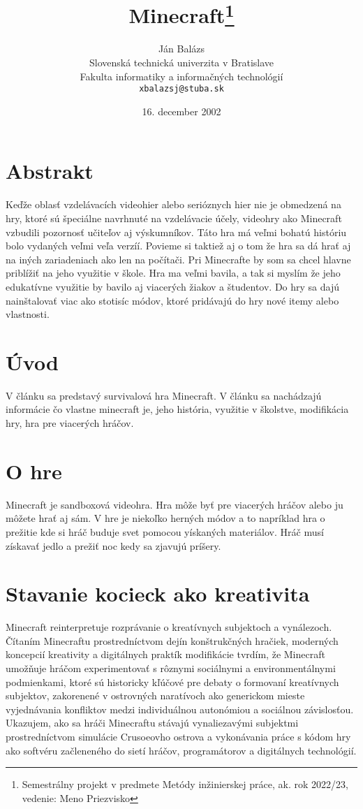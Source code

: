 \documentclass[10pt,twoside,slovak,a4paper]{article}
\title{Minecraft\thanks{Semestrálny projekt v predmete Metódy inžinierskej práce, ak. rok 2022/23, vedenie: Meno Priezvisko}} %
\author{Ján Balázs\\[2pt]
	{\small Slovenská technická univerzita v Bratislave}\\
	{\small Fakulta informatiky a informačných technológií}\\
	{\small \texttt{xbalazsj@stuba.sk}}
	}
\date{\small 16. december 2002} %
\begin{document}
\maketitle

\section{Abstrakt}

Keďže oblasť vzdelávacích videohier alebo serióznych hier nie je
obmedzená na hry, ktoré sú špeciálne navrhnuté na vzdelávacie účely,
videohry ako Minecraft vzbudili pozornosť učiteľov aj výskumníkov. Táto hra
má veľmi bohatú históriu bolo vydaných veľmi veľa verzíí. Povieme si taktiež
aj o tom že hra sa dá hrať aj na iných zariadeniach ako len na počítači.
Pri Minecrafte by som sa chcel hlavne priblížiť na jeho využitie v škole. Hra
ma veľmi bavila, a tak si myslím že jeho edukatívne využitie by bavilo aj
viacerých žiakov a študentov. Do hry sa dajú nainštalovať viac ako stotisíc
módov, ktoré pridávajú do hry nové itemy alebo vlastnosti.

\section{Úvod}

V článku sa predstavý survivalová hra Minecraft. V článku sa nachádzajú informácie čo vlastne minecraft je, jeho história, využitie v školstve, modifikácia hry, hra pre viacerých hráčov.



\section{O hre} 

Minecraft je sandboxová videohra. Hra môže byť pre viacerých hráčov alebo ju môžete hrať aj sám. V hre je niekoľko herných módov a to napríklad hra o prežitie kde si hráč buduje svet pomocou yískaných materiálov. Hráč musí získavať jedlo a prežiť noc kedy sa zjavujú príšery.

\section{Stavanie kocieck ako kreativita} 

Minecraft reinterpretuje rozprávanie o kreatívnych subjektoch a vynálezoch. Čítaním Minecraftu prostredníctvom dejín konštrukčných hračiek, moderných koncepcií kreativity a digitálnych praktík modifikácie tvrdím, že Minecraft umožňuje hráčom experimentovať s rôznymi sociálnymi a environmentálnymi podmienkami, ktoré sú historicky kľúčové pre debaty o formovaní kreatívnych subjektov, zakorenené v ostrovných naratívoch ako generickom mieste vyjednávania konfliktov medzi individuálnou autonómiou a sociálnou závislosťou. Ukazujem, ako sa hráči Minecraftu stávajú vynaliezavými subjektmi prostredníctvom simulácie Crusoeovho ostrova a vykonávania práce s kódom hry ako softvéru začleneného do sietí hráčov, programátorov a digitálnych technológií. \cite{kreativita}
\end{document}
